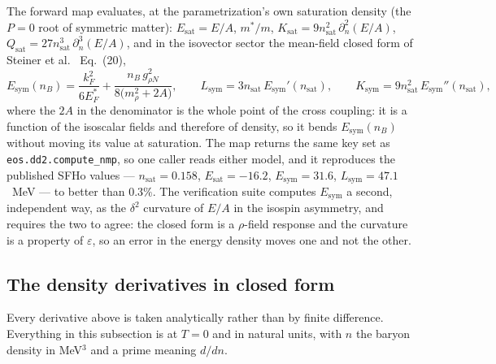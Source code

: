 \documentclass[aps,prc,onecolumn,superscriptaddress,nofootinbib,10pt]{revtex4-2}
\newcommand{\nB}{n_B}
\newcommand{\nsat}{n_{\mathrm{sat}}}
\begin{document}
The forward map evaluates, at the parametrization's own saturation density
(the $P=0$ root of symmetric matter): $E_{\mathrm{sat}} = E/A$, $m^*/m$,
$K_{\mathrm{sat}} = 9 \nsat^2\, \partial^2_n (E/A)$,
$Q_{\mathrm{sat}} = 27 \nsat^3\, \partial^3_n (E/A)$, and in the isovector
sector the mean-field closed form of Steiner et al.~\cite{Steiner2005}
Eq.~(20),
%
\begin{equation}
E_{\mathrm{sym}}(\nB) = \frac{k_F^2}{6 E^*_F}
  + \frac{\nB\, g_{\rho N}^2}{8 \big( m_\rho^2 + 2 A \big)} ,
\qquad L_{\mathrm{sym}} = 3 \nsat\, E_{\mathrm{sym}}'(\nsat),
\qquad K_{\mathrm{sym}} = 9 \nsat^2\, E_{\mathrm{sym}}''(\nsat) ,
\label{eq:esym}
\end{equation}
%
where the $2A$ in the denominator is the whole point of the cross coupling: it
is a function of the isoscalar fields and therefore of density, so it bends
$E_{\mathrm{sym}}(\nB)$ without moving its value at saturation. The map
returns the same key set as \texttt{eos.dd2.compute\_nmp}, so one caller reads
either model, and it reproduces the published SFHo values --- $\nsat = 0.158$,
$E_{\mathrm{sat}} = -16.2$, $E_{\mathrm{sym}} = 31.6$, $L_{\mathrm{sym}} =
47.1$~MeV --- to better than $0.3\%$. The verification suite computes
$E_{\mathrm{sym}}$ a second, independent way, as the $\delta^2$ curvature of
$E/A$ in the isospin asymmetry, and requires the two to agree: the closed form
is a $\rho$-field response and the curvature is a property of $\varepsilon$,
so an error in the energy density moves one and not the other.

\subsection{The density derivatives in closed form}
\label{sec:snmderiv}

Every derivative above is taken analytically rather than by finite
difference. Everything in this subsection is at $T = 0$ and in natural units,
with $n$ the baryon density in MeV$^3$ and a prime meaning $d/dn$.
\end{document}
